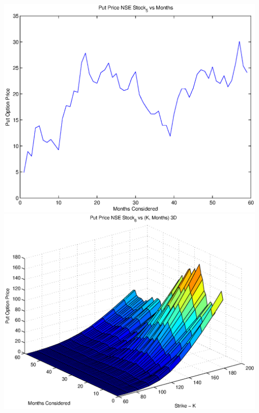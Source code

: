 \documentclass{article}
\begin{document}
\includegraphics[width=\textwidth]{Put_Price_NSE_Stock_5_vs_Months} \\

\includegraphics[width=\textwidth]{Put_Price_NSE_Stock_6_vs_(K,_Months)_3D} \\
\end{document}
